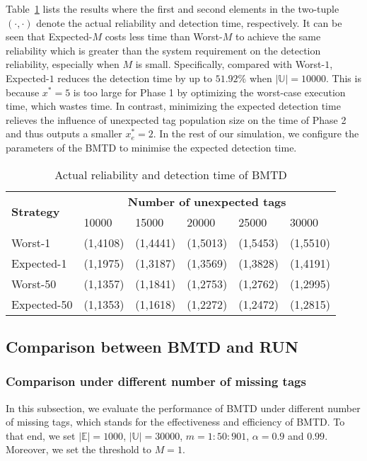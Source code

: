 \documentclass[10pt, twocolumn]{IEEEtran}
\begin{document}
Table~\ref{Tab:worst_exp} lists the results where the first and second elements in the two-tuple $(\cdot,\cdot)$ denote the actual reliability and detection time, respectively. It can be seen that Expected-$M$ costs less time than Worst-$M$ to achieve the same reliability which is greater than the system requirement on the detection reliability, especially when $M$ is small. Specifically, compared with Worst-$1$, Expected-$1$ reduces the detection time by up to $51.92\%$ when $|\mathbb{U}|=10000$. This is because $x^*=5$ is  too large for Phase 1 by optimizing the worst-case execution time, which wastes time. In contrast, minimizing the expected detection time relieves the influence of unexpected tag population size on the time of Phase 2 and thus outputs a smaller $x^*_e=2$.
In the rest of our simulation, we configure the parameters of the BMTD to minimise the expected detection time. 
\begin{table}[!htbp]
\centering
\caption{Actual reliability and detection time of BMTD}
\label{Tab:worst_exp}
\begin{tabular}{|l|l|l|l|l|l|}
\hline
\multirow{2}{*}{\textbf{Strategy}} & \multicolumn{5}{c|}{\textbf{Number of unexpected tags}}\\
\cline{2-6} & 10000 & 15000 &20000&25000&30000\\
\hline
Worst-1& (1,4108)  & (1,4441) & (1,5013) &(1,5453) &(1,5510) \\
\hline
Expected-1& (1,1975) &  (1,3187)  &  (1,3569) &  (1,3828)& (1,4191) \\
\hline
Worst-50& (1,1357)  & (1,1841) & (1,2753) & (1,2762)& (1,2995)\\
\hline
Expected-50& (1,1353) & (1,1618) &  (1,2272) & (1,2472) &(1,2815)  \\
\hline
\end{tabular}
\end{table}

\subsection{Comparison between BMTD and RUN}

\subsubsection{Comparison under different number of missing tags}

In this subsection, we evaluate the performance of BMTD under different number of missing tags, which stands for the effectiveness and efficiency of BMTD. To that end, we set $|\mathbb{E}|=1000$, $|\mathbb{U}|=30000$, $m=1:50:901$, $\alpha=0.9$ and $0.99$. Moreover, we set the threshold to $M=1$.
\end{document}
